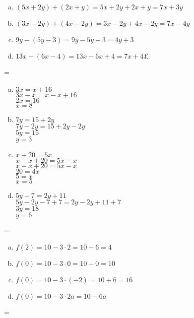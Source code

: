 \documentclass {article}
\newenvironment{absolutelynopagebreak}
  {\par\nobreak\vfil\penalty0\vfilneg
   \vtop\bgroup}
  {\par\xdef\tpd{\the\prevdepth}\egroup
   \prevdepth=\tpd}
\begin{document}
\begin{absolutelynopagebreak}
\begin{enumerate}[a)]
\item $(5x + 2y) + (2x + y) = 5x + 2y + 2x + y = 7x + 3y$
\item $(3x - 2y) + (4x - 2y) = 3x - 2y + 4x - 2y = 7x - 4y$
\item $9y - (5y - 3) = 9y - 5y + 3 = 4y + 3$
\item $13x - (6x - 4) = 13x - 6x + 4 = 7x + 4£$ 
\end{enumerate}
\end{absolutelynopagebreak}

\begin{absolutelynopagebreak}
\begin{enumerate}[a)]
\item $3x = x + 16$\\
$3x - x = x - x+ 16$\\
$2x  = 16$\\
$x  = 8$
\item $7y = 15 + 2y$\\
$7y -2y = 15 + 2y - 2y$\\
$5y = 15$\\
$y = 3$
\item $x + 20 = 5x$\\
$x - x + 20 = 5x -x$\\
$x - x + 20 = 5x -x$\\
$20 = 4x$\\
$5 = x$\\
$x = 5$
\item $5y - 7 = 2y + 11$\\
$5y - 2y - 7  + 7 = 2y - 2y + 11 + 7$\\
$3y = 18$\\
$y = 6$\\ 
\end{enumerate}
\end{absolutelynopagebreak} 

\begin{absolutelynopagebreak}
\begin{enumerate}[a)]
\item $f(2) = 10 - 3 \cdot 2 = 10 - 6 = 4$
\item $f(0) = 10 - 3 \cdot 0 = 10 - 0 = 10$
\item $f(0) = 10 - 3 \cdot (-2) = 10 + 6 = 16$
\item $f(0) = 10 - 3 \cdot 2a = 10 - 6a$
\end{enumerate}
\end{absolutelynopagebreak} 
\end{document}
